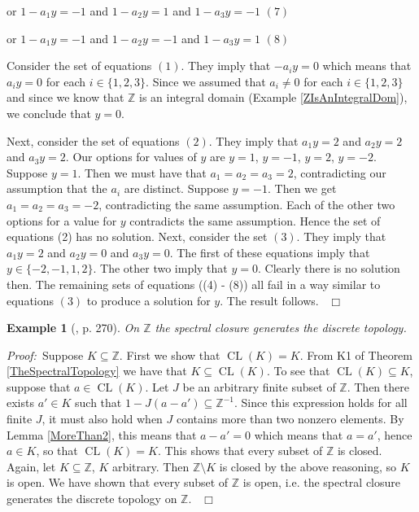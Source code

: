 \documentclass[12pt, oneside]{book}
\newtheorem{example}[theorem]{Example}
\newcommand{\proof}{{\noindent \it Proof:~}}
\newcommand{\qed}{\hfill ~$\Box$\\}
\def\CL{\operatorname{CL}}
\begin{document}
\vskip 0.3cm or \quad $1-a_1y=-1$ \quad \space and \qquad $1-a_2y=1$ \qquad 
and \qquad $1-a_3y=-1$ \hfill $(7)$

\vskip 0.3cm or \quad $1-a_1y=-1$ \quad \space and \qquad $1-a_2y=-1$ \quad \space 
and \qquad $1-a_3y=1$ \hfill $(8)$

\vskip 0.3cm
\noindent Consider the set of equations $(1)$. They imply that $-a_i y =0$ which means that $a_i y =0$ 
for each $i \in  \{ 1,2,3 \}$. Since we assumed that $a_i \not = 0$ for each $i \in \{ 1,2,3 \}$ and since 
we know that $\mathbb{Z}$ is an integral domain (Example \ref{ZIsAnIntegralDom}), we conclude that $y=0$.

\vskip 0.3cm 
\noindent Next, consider the set of equations $(2)$. They imply that $a_1 y =2$ and $a_2 y =2$ and 
$a_3 y =2$. 
Our options for values of $y$ are $y=1$, $y=-1$, $y=2$, $y=-2$. Suppose $y = 1$. Then we must have 
that $a_1 = a_2 = a_3 = 2$, contradicting our assumption that the $a_i$ are distinct. Suppose $y = -1$. 
Then we get $a_1 = a_2 = a_3 = -2$, contradicting the same assumption. Each of the other two options for 
a value for $y$ contradicts the same assumption. Hence the set of equations (2) has no solution.
\vskip 0.3cm 
\noindent Next, consider the set $(3)$. They imply that $a_1 y = 2$ and $a_2 y =0$ and $a_3 y =0$.
The first of these equations imply that $y \in  \{ -2,-1,1,2 \}$. The other two imply that $y=0$. 
Clearly there is no solution then. 
\vskip 0.3cm
\noindent The remaining sets of equations ((4) - (8)) all fail in a way similar to equations $(3)$ 
to produce a solution for $y$. The result follows. \qed


\begin{example}[\cite{CH3}, p. 270] \label{SpectralTopOnZ}
\normalfont
\noindent On $\mathbb{Z}$ the spectral closure generates the discrete topology.
\end{example}

\proof \space Suppose $K \subseteq \mathbb{Z}$. First we show that $\CL(K)=K$. 
From K1 of Theorem \ref{TheSpectralTopology} we have that $K \subseteq \CL(K)$. 
To see that $\CL(K) \subseteq K$, suppose that $a \in \CL(K)$. Let $J$ be an arbitrary finite subset of $\mathbb{Z}$. Then there exists $a' \in K$ such that $1-J(a-a') \subseteq \mathbb{Z}^{-1}$. 
Since this expression holds for all finite $J$, it must also hold when $J$ contains more than two nonzero elements. By Lemma \ref{MoreThan2}, this means that $a-a'=0$ which means that $a=a'$, hence $a \in K$, so that $\CL(K)=K$. This shows that every subset of $\mathbb{Z}$ is closed. 
\vskip 0.3cm
\noindent Again, let $K \subseteq \mathbb{Z}$, $K$ arbitrary. Then $\mathbb{Z} \setminus K$ is closed by the above reasoning, so $K$ is open. We have shown that every subset of $\mathbb{Z}$ is open, i.e. the spectral closure generates the discrete topology on $\mathbb{Z}$. \qed
\end{document}
